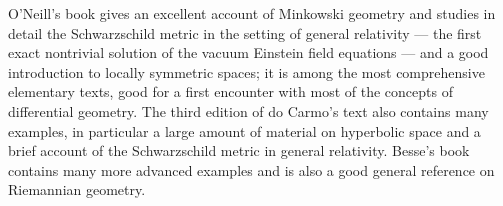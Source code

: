 %
%

\begin{remark}
  \label{rem:pet-ch4-further-study}

  O'Neill's book gives an excellent account of Minkowski geometry and studies
  in detail the Schwarzschild metric in the setting of general relativity — the
  first exact nontrivial solution of the vacuum Einstein field equations — and
  a good introduction to locally symmetric spaces; it is among the most
  comprehensive elementary texts, good for a first encounter with most of the
  concepts of differential geometry. The third edition of do Carmo's text also
  contains many examples, in particular a large amount of material on
  hyperbolic space and a brief account of the Schwarzschild metric in general
  relativity. Besse's book contains many more advanced examples and is also a
  good general reference on Riemannian geometry.
\end{remark}
